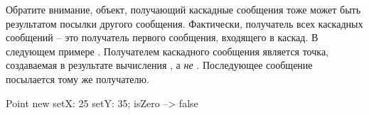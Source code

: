 \documentclass[a4paper,10pt,twoside]{book}
\begin{document}
Обратите внимание, объект, получающий каскадные сообщения тоже может быть результатом посылки другого сообщения.
Фактически, получатель всех каскадных сообщений -- это получатель первого сообщения, входящего в каскад. В следующем примере . Получателем каскадного сообщения  является точка, создаваемая в результате вычисления , а \emph{не} . Последующее сообщение  посылается тому же получателю.

\begin{code}{}
Point new setX: 25 setY: 35; isZero --> false
\end{code}

\end{document}
